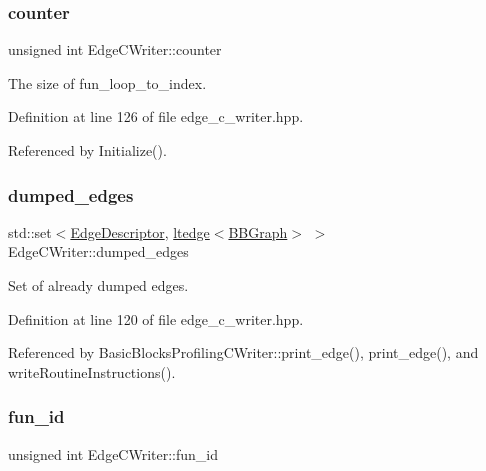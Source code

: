 \subsubsection{\texorpdfstring{counter}{counter}}
{\footnotesize\ttfamily unsigned int Edge\+C\+Writer\+::counter\hspace{0.3cm}{\ttfamily [protected]}}



The size of fun\+\_\+loop\+\_\+to\+\_\+index. 



Definition at line 126 of file edge\+\_\+c\+\_\+writer.\+hpp.



Referenced by Initialize().

\mbox{\label{classEdgeCWriter_a8253f69d8bed3c2e26a00ecc16955c16}} 
\subsubsection{\texorpdfstring{dumped\+\_\+edges}{dumped\_edges}}
{\footnotesize\ttfamily std\+::set$<$\hyperlink{graph_8hpp_a9eb9afea34e09f484b21f2efd263dd48}{Edge\+Descriptor}, \hyperlink{structltedge}{ltedge}$<$\hyperlink{structBBGraph}{B\+B\+Graph}$>$ $>$ Edge\+C\+Writer\+::dumped\+\_\+edges\hspace{0.3cm}{\ttfamily [protected]}}



Set of already dumped edges. 



Definition at line 120 of file edge\+\_\+c\+\_\+writer.\+hpp.



Referenced by Basic\+Blocks\+Profiling\+C\+Writer\+::print\+\_\+edge(), print\+\_\+edge(), and write\+Routine\+Instructions().

\mbox{\label{classEdgeCWriter_a24e5a49302d7900304d7c020889aa979}} 
\subsubsection{\texorpdfstring{fun\+\_\+id}{fun\_id}}
{\footnotesize\ttfamily unsigned int Edge\+C\+Writer\+::fun\+\_\+id\hspace{0.3cm}{\ttfamily [protected]}}



